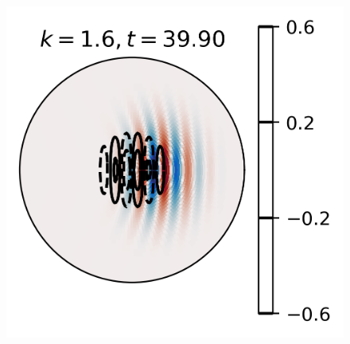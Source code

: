 \begin{figure}
    \centering
    \includegraphics{Rossby_plots/Rossby_k1d6_tt39d90}
    \caption{}
    \label{fig:Rossby_k1d6_tt39d90}
\end{figure}


